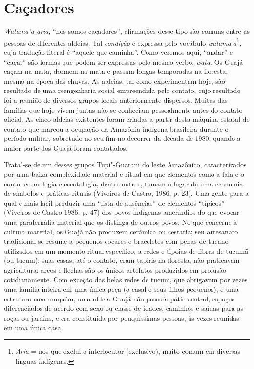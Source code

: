 \section{Caçadores}

\emph{Watama'a aria}, ``nós somos caçadores'', afirmações desse tipo são
comuns entre as pessoas de diferentes aldeias. Tal \emph{condição} é
expressa pelo vocábulo \emph{watama'a}\footnote{\emph{Aria} = nós que
  exclui o interlocutor (exclusivo), muito comum em diversas línguas
  indígenas.}, cuja tradução literal é ``aquele que caminha''. Como
veremos aqui, ``andar'' e ``caçar'' são formas que podem ser expressas pelo
mesmo verbo: \emph{wata}. Os Guajá caçam na mata, dormem na mata e
passam longas temporadas na floresta, mesmo na época das chuvas. As
aldeias, tal como experimentam hoje, são resultado de uma reengenharia
social empreendida pelo contato, cujo resultado foi a reunião de
diversos grupos locais anteriormente dispersos. Muitas das famílias que
hoje vivem juntas não se conheciam pessoalmente antes do contato
oficial. As cinco aldeias existentes foram criadas a partir desta
máquina estatal de contato que marcou a ocupação da Amazônia indígena
brasileira durante o período militar, sobretudo no seu fim no decorrer
da década de 1980, quando a maior parte dos Guajá foram contatados.

Trata"-se de um desses grupos Tupi"-Guarani do leste Amazônico,
caracterizados por uma baixa complexidade material e ritual em que
elementos como a fala e o canto, cosmologia e escatologia, dentre
outros, tomam o lugar de uma economia de símbolos e práticas rituais
(Viveiros de Castro, 1986, p. 23). Uma gente para a qual é mais fácil
produzir uma ``lista de ausências'' de elementos ``típicos'' (Viveiros
de Castro 1986, p. 47) dos povos indígenas ameríndios do que evocar uma
parafernália material que os distinga de outros povos. No que concerne à
cultura material, os Guajá não produzem cerâmica ou cestaria; seu
artesanato tradicional se resume a pequenos cocares e braceletes com
penas de tucano utilizados em um momento ritual específico; a redes e
tipoias de fibras de tucumã (ou tucum); suas casas, até o contato, eram
tapiris na floresta; não praticavam agricultura; arcos e flechas são os
únicos artefatos produzidos em profusão cotidianamente. Com exceção das
belas redes de tucum, que abrigavam por vezes uma família inteira em uma
única peça (o casal e seus filhos pequenos), e uma estrutura com moquém,
uma aldeia Guajá não possuía pátio central, espaços diferenciados de
acordo com sexo ou classe de idades, caminhos e saídas para as roças ou
jardins, e era constituída por pouquíssimas pessoas, às vezes reunidas
em uma única casa.

